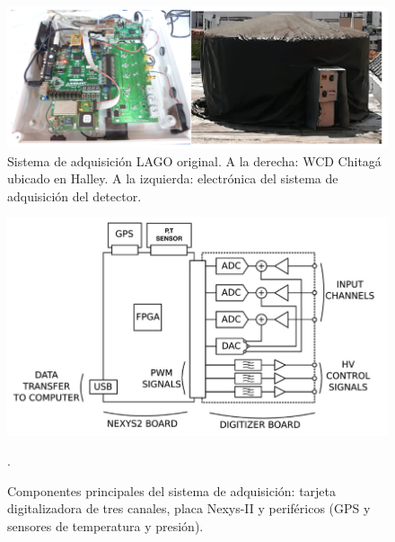 \begin{figure}[H]
\includegraphics[scale=0.6]{Figs/lagoelectro.PNG} 
\centering
\caption[Sistema de adquisición LAGO original]{Sistema de adquisición LAGO original.
A la derecha: WCD Chitagá ubicado en Halley.
A la izquierda: electrónica del sistema de adquisición del detector.}
\label{detec}
\end{figure}

\begin{figure}[H]
\includegraphics[scale=0.6]{Figs/bloquelago.PNG} 
\centering
\caption[Componentes principales del sistema de adquisición]{Componentes principales del sistema de adquisición: tarjeta digitalizadora de tres canales, placa Nexys-II y periféricos (GPS y sensores de temperatura y presión).~\citep{haro2016data}}.
\label{sistema_adquisicion}
\end{figure}



